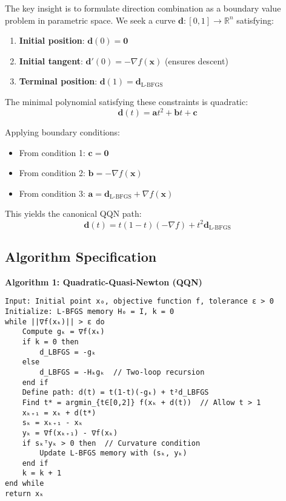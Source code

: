 The key insight is to formulate direction combination as a boundary value problem in parametric space. We seek a curve \(\mathbf{d}: [0,1] \rightarrow \mathbb{R}^n\) satisfying:

\begin{enumerate}
\def\labelenumi{\arabic{enumi}.}
\tightlist
\item
  \textbf{Initial position}: \(\mathbf{d}(0) = \mathbf{0}\)
\item
  \textbf{Initial tangent}: \(\mathbf{d}'(0) = -\nabla f(\mathbf{x})\) (ensures descent)
\item
  \textbf{Terminal position}: \(\mathbf{d}(1) = \mathbf{d}_{\text{L-BFGS}}\)
\end{enumerate}

The minimal polynomial satisfying these constraints is quadratic:
\[\mathbf{d}(t) = \mathbf{a}t^2 + \mathbf{b}t + \mathbf{c}\]

Applying boundary conditions:

\begin{itemize}
\tightlist
\item
  From condition 1: \(\mathbf{c} = \mathbf{0}\)
\item
  From condition 2: \(\mathbf{b} = -\nabla f(\mathbf{x})\)
\item
  From condition 3: \(\mathbf{a} = \mathbf{d}_{\text{L-BFGS}} + \nabla f(\mathbf{x})\)
\end{itemize}

This yields the canonical QQN path:
\[\mathbf{d}(t) = t(1-t)(-\nabla f) + t^2 \mathbf{d}_{\text{L-BFGS}}\]

\hypertarget{algorithm-specification}{%
\subsection{Algorithm Specification}\label{algorithm-specification}}

\textbf{Algorithm 1: Quadratic-Quasi-Newton (QQN)}

\begin{verbatim}
Input: Initial point x₀, objective function f, tolerance ε > 0
Initialize: L-BFGS memory H₀ = I, k = 0
while ||∇f(xₖ)|| > ε do
    Compute gₖ = ∇f(xₖ)
    if k = 0 then
        d_LBFGS = -gₖ
    else
        d_LBFGS = -Hₖgₖ  // Two-loop recursion
    end if
    Define path: d(t) = t(1-t)(-gₖ) + t²d_LBFGS
    Find t* = argmin_{t∈[0,2]} f(xₖ + d(t))  // Allow t > 1
    xₖ₊₁ = xₖ + d(t*)
    sₖ = xₖ₊₁ - xₖ
    yₖ = ∇f(xₖ₊₁) - ∇f(xₖ)
    if sₖᵀyₖ > 0 then  // Curvature condition
        Update L-BFGS memory with (sₖ, yₖ)
    end if
    k = k + 1
end while
return xₖ
\end{verbatim}

